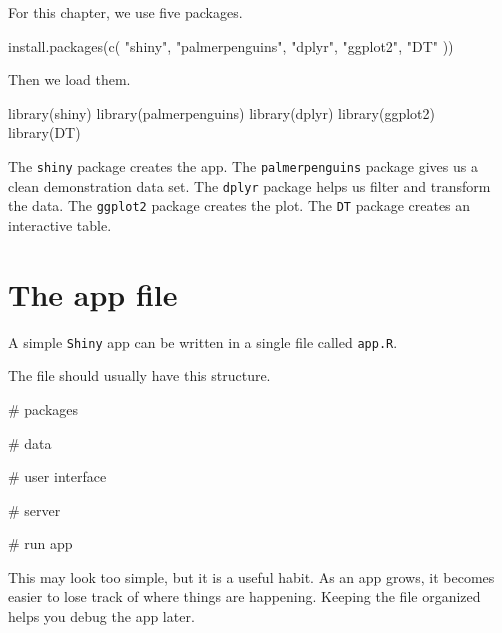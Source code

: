 \documentclass[
  letterpaper,
  DIV=11,
  numbers=noendperiod]{scrreprt}
\newenvironment{Shaded}{\begin{snugshade}}{\end{snugshade}}
\newcommand{\CommentTok}[1]{\textcolor[rgb]{0.37,0.37,0.37}{#1}}
\newcommand{\FunctionTok}[1]{\textcolor[rgb]{0.28,0.35,0.67}{#1}}
\newcommand{\NormalTok}[1]{\textcolor[rgb]{0.00,0.23,0.31}{#1}}
\newcommand{\StringTok}[1]{\textcolor[rgb]{0.13,0.47,0.30}{#1}}
\begin{document}
For this chapter, we use five packages.

\begin{Shaded}
\begin{Highlighting}[]
\FunctionTok{install.packages}\NormalTok{(}\FunctionTok{c}\NormalTok{(}
  \StringTok{"shiny"}\NormalTok{,}
  \StringTok{"palmerpenguins"}\NormalTok{,}
  \StringTok{"dplyr"}\NormalTok{,}
  \StringTok{"ggplot2"}\NormalTok{,}
  \StringTok{"DT"}
\NormalTok{))}
\end{Highlighting}
\end{Shaded}

Then we load them.

\begin{Shaded}
\begin{Highlighting}[]
\FunctionTok{library}\NormalTok{(shiny)}
\FunctionTok{library}\NormalTok{(palmerpenguins)}
\FunctionTok{library}\NormalTok{(dplyr)}
\FunctionTok{library}\NormalTok{(ggplot2)}
\FunctionTok{library}\NormalTok{(DT)}
\end{Highlighting}
\end{Shaded}

The \texttt{shiny} package creates the app. The \texttt{palmerpenguins}
package gives us a clean demonstration data set. The \texttt{dplyr}
package helps us filter and transform the data. The \texttt{ggplot2}
package creates the plot. The \texttt{DT} package creates an interactive
table.

\section{The app file}\label{the-app-file}

A simple \texttt{Shiny} app can be written in a single file called
\texttt{app.R}.

The file should usually have this structure.

\begin{Shaded}
\begin{Highlighting}[]
\CommentTok{\# packages}

\CommentTok{\# data}

\CommentTok{\# user interface}

\CommentTok{\# server}

\CommentTok{\# run app}
\end{Highlighting}
\end{Shaded}

This may look too simple, but it is a useful habit. As an app grows, it
becomes easier to lose track of where things are happening. Keeping the
file organized helps you debug the app later.
\end{document}
